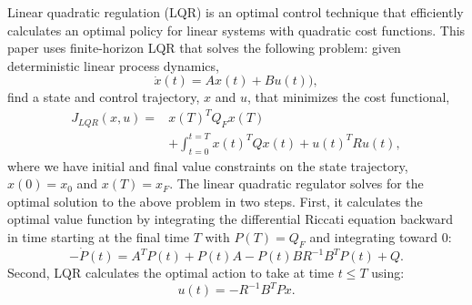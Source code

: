 \documentclass[letterpaper, 10pt, english, conference]{IEEEtran}
\begin{document}
Linear quadratic regulation (LQR) is an optimal control technique that
efficiently calculates an optimal policy for linear systems with
quadratic cost functions. This paper uses finite-horizon LQR that
solves the following problem: given deterministic linear process
dynamics,
\begin{equation}
\dot{x}(t) = Ax(t) + Bu(t)),
\label{eqn:linear_system}
\end{equation}
find a state and control trajectory, $x$ and $u$, that minimizes
the cost functional,
\begin{align} \nonumber
J_{LQR}(x,u) = & x(T)^T Q_F x(T) \\
& + \int_{t=0}^{t=T} x(t)^T Q x(t) + u(t)^T R u(t),
\label{eqn:lqr_cost}
\end{align}
where we have initial and final value constraints on the state
trajectory, $x(0) = x_0$ and $x(T) = x_F$. The linear quadratic
regulator solves for the optimal solution to the above problem in two
steps. First, it calculates the optimal value function by integrating
the differential Riccati equation backward in time starting at the
final time $T$ with $P(T) = Q_F$ and integrating toward $0$:
\[
-\dot{P}(t) = A^T P(t) + P(t) A - P(t) B R^{-1} B^T P(t) + Q.
\]
Second, LQR calculates the optimal action to take at time $t \leq T$
using:
\[
u(t) = -R^{-1} B^T P x.
\]
\end{document}
